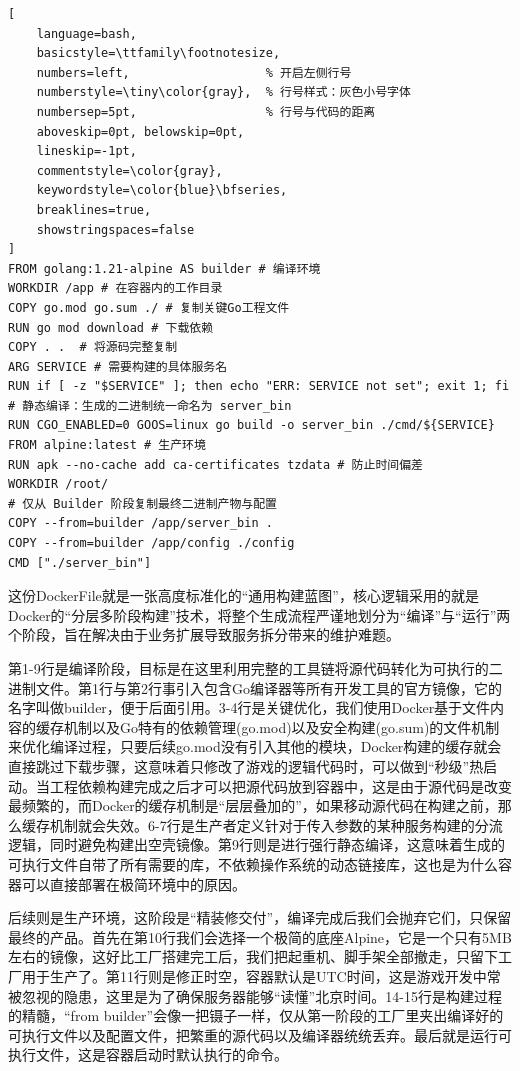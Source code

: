 \begin{tcolorbox}[title=拆分后的通用Dockerfile]
\begin{lstlisting}[
    language=bash,
    basicstyle=\ttfamily\footnotesize,
    numbers=left,                   % 开启左侧行号
    numberstyle=\tiny\color{gray},  % 行号样式：灰色小号字体
    numbersep=5pt,                  % 行号与代码的距离
    aboveskip=0pt, belowskip=0pt,
    lineskip=-1pt,
    commentstyle=\color{gray},
    keywordstyle=\color{blue}\bfseries,
    breaklines=true,
    showstringspaces=false
]
FROM golang:1.21-alpine AS builder # 编译环境 
WORKDIR /app # 在容器内的工作目录
COPY go.mod go.sum ./ # 复制关键Go工程文件
RUN go mod download # 下载依赖
COPY . .  # 将源码完整复制
ARG SERVICE # 需要构建的具体服务名
RUN if [ -z "$SERVICE" ]; then echo "ERR: SERVICE not set"; exit 1; fi
# 静态编译：生成的二进制统一命名为 server_bin
RUN CGO_ENABLED=0 GOOS=linux go build -o server_bin ./cmd/${SERVICE}
FROM alpine:latest # 生产环境
RUN apk --no-cache add ca-certificates tzdata # 防止时间偏差
WORKDIR /root/
# 仅从 Builder 阶段复制最终二进制产物与配置
COPY --from=builder /app/server_bin .
COPY --from=builder /app/config ./config
CMD ["./server_bin"]
\end{lstlisting}
\end{tcolorbox}

这份DockerFile就是一张高度标准化的“通用构建蓝图”，核心逻辑采用的就是Docker的“分层多阶段构建”技术，将整个生成流程严谨地划分为“编译”与“运行”两个阶段，旨在解决由于业务扩展导致服务拆分带来的维护难题。

第1-9行是编译阶段，目标是在这里利用完整的工具链将源代码转化为可执行的二进制文件。第1行与第2行事引入包含Go编译器等所有开发工具的官方镜像，它的名字叫做builder，便于后面引用。3-4行是关键优化，我们使用Docker基于文件内容的缓存机制以及Go特有的依赖管理(go.mod)以及安全构建(go.sum)的文件机制来优化编译过程，只要后续go.mod没有引入其他的模块，Docker构建的缓存就会直接跳过下载步骤，这意味着只修改了游戏的逻辑代码时，可以做到“秒级”热启动。当工程依赖构建完成之后才可以把源代码放到容器中，这是由于源代码是改变最频繁的，而Docker的缓存机制是“层层叠加的”，如果移动源代码在构建之前，那么缓存机制就会失效。6-7行是生产者定义针对于传入参数的某种服务构建的分流逻辑，同时避免构建出空壳镜像。第9行则是进行强行静态编译，这意味着生成的可执行文件自带了所有需要的库，不依赖操作系统的动态链接库，这也是为什么容器可以直接部署在极简环境中的原因。

后续则是生产环境，这阶段是“精装修交付”，编译完成后我们会抛弃它们，只保留最终的产品。首先在第10行我们会选择一个极简的底座Alpine，它是一个只有5MB左右的镜像，这好比工厂搭建完工后，我们把起重机、脚手架全部撤走，只留下工厂用于生产了。第11行则是修正时空，容器默认是UTC时间，这是游戏开发中常被忽视的隐患，这里是为了确保服务器能够“读懂”北京时间。14-15行是构建过程的精髓，“from builder”会像一把镊子一样，仅从第一阶段的工厂里夹出编译好的可执行文件以及配置文件，把繁重的源代码以及编译器统统丢弃。最后就是运行可执行文件，这是容器启动时默认执行的命令。


